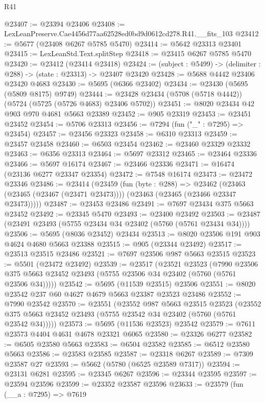 \begin{lexlean}{R41}
\begin{coremodule}
@23407 := @23394 @23406
@23408 := LexLeanPreserve.Cae4456d77aa62528ed0bd9d0612cd278.R41.__fits_103
@23412 := @5677 (@23408 @6267 @5785 @5470)
@23414 := @5642 @23313 @23401
@23415 := LexLeanStd.Text.splitStep
@23418 := @23415 @6267 @5785 @5470
@23420 := @23412 (@23414 @23418)
@23424 := (subject : @5499) -> (delimiter : @288) -> (state : @23313) -> @23407 @23420
@23428 := @5688 @4442 @23406 @23420 @4683
@23430 := @5695 (@6366 @23402)
@23434 := @23430 (@5695 (@5809 @8175) @9749)
@23444 := @23428 @23434 (@5708 (@5718 @4442)) (@5724 (@5725 (@5726 @4683) @23406 @5702))
@23451 := @8020 @23434 @42 @903 @970 @4681 @5663 @23389
@23452 := @905 @23319
@23453 := @23451 @23452
@23454 := @5706 @23313
@23456 := @7294 (fun ("_" : @7295) => @23454)
@23457 := @23456 @23323
@23458 := @6310 @23313
@23459 := @23457 @23458
@23460 := @6503 @23454
@23462 := @23460 @23329 @23332
@23463 := @6356 @23313
@23464 := @5697 @23312
@23465 := @23464 @23336
@23466 := @5697 @16174
@23467 := @23466 @23336
@23471 := @16474 (@23136 @6277 @23347 @23354)
@23472 := @7548 @16174
@23473 := @23472 @23346
@23486 := @23414
    (@23459
      (fun (byte : @288) =>
      @23462 (@23463 (@23465 (@23467 (@23471 @23473)))) (@23463 (@23465 (@23466 @23347 @23473)))))
@23487 := @23453 @23486
@23491 := @7697 @23434 @375 @5663 @23452
@23492 := @23345 @5470
@23493 := @23400 @23492
@23503 := @23487 (@23491 @23493 (@5755 @23434 @34 @23402 (@5760 (@5761 @23434 @34))))
@23506 := @5695 (@8036 @23452) @23434
@23513 := @8020 @23506 @191 @903 @4624 @4680 @5663 @23388
@23515 := @905 (@23344 @23492)
@23517 := @23513 @23515 @23486
@23521 := @7697 @23506 @987 @5663 @23515
@23523 := @5501 (@23472 @23492)
@23539 := @23517
    (@23521
      @23523
      (@7990 @23506 @375 @5663 @23452 @23493 (@5755 @23506 @34 @23402 (@5760 (@5761 @23506 @34)))))
@23542 := @5695 (@11539 @23515) @23506
@23551 := @8020 @23542 @237 @60 @4627 @4679 @5663 @23387 @23523 @23486
@23552 := @7990 @23542
@23570 := @23551
    (@23552
      @987
      @5663
      @23515
      @23523
      (@23552 @375 @5663 @23452 @23493 (@5755 @23542 @34 @23402 (@5760 (@5761 @23542 @34)))))
@23573 := @5695 (@11536 @23523) @23542
@23579 := @7611 @23573 @4404 @4631 @4678 @23321 @6065
@23580 := @23326 @6277
@23582 := @6505 @23580 @5663
@23583 := @6504 @23582
@23585 := @6512 @23580 @5663
@23586 := @23583 @23585
@23587 := @23318 @6267
@23589 := @7309 @23587 @27
@23593 := @5662 (@5780 (@6525 @23589 @7317))
@23594 := @23131 @6281
@23595 := @23345 @6267
@23596 := @23344 @23595
@23597 := @23594 @23596
@23599 := @23352 @23587 @23596
@23633 := @23579
    (fun (__a : @7295) =>
    @7619

\end{coremodule}
\end{lexlean}
